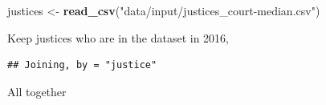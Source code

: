 \documentclass[]{book}
\newenvironment{Shaded}{\begin{snugshade}}{\end{snugshade}}
\newcommand{\CommentTok}[1]{\textcolor[rgb]{0.56,0.35,0.01}{\textit{#1}}}
\newcommand{\DataTypeTok}[1]{\textcolor[rgb]{0.13,0.29,0.53}{#1}}
\newcommand{\DecValTok}[1]{\textcolor[rgb]{0.00,0.00,0.81}{#1}}
\newcommand{\KeywordTok}[1]{\textcolor[rgb]{0.13,0.29,0.53}{\textbf{#1}}}
\newcommand{\NormalTok}[1]{#1}
\newcommand{\OperatorTok}[1]{\textcolor[rgb]{0.81,0.36,0.00}{\textbf{#1}}}
\newcommand{\StringTok}[1]{\textcolor[rgb]{0.31,0.60,0.02}{#1}}
\theoremstyle{definition}
\theoremstyle{definition}
\theoremstyle{definition}
\theoremstyle{remark}
\begin{document}
\begin{Shaded}
\begin{Highlighting}[]
\NormalTok{justices <-}\StringTok{ }\KeywordTok{read_csv}\NormalTok{(}\StringTok{"data/input/justices_court-median.csv"}\NormalTok{)}
\end{Highlighting}
\end{Shaded}

Keep justices who are in the dataset in 2016,

\begin{Shaded}
\end{Shaded}

\begin{verbatim}
## Joining, by = "justice"
\end{verbatim}

All together
\end{document}
